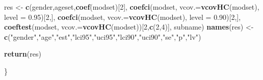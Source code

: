 \documentclass[
]{article}
\newenvironment{Shaded}{\begin{snugshade}}{\end{snugshade}}
\newcommand{\DataTypeTok}[1]{\textcolor[rgb]{0.13,0.29,0.53}{#1}}
\newcommand{\DecValTok}[1]{\textcolor[rgb]{0.00,0.00,0.81}{#1}}
\newcommand{\FloatTok}[1]{\textcolor[rgb]{0.00,0.00,0.81}{#1}}
\newcommand{\KeywordTok}[1]{\textcolor[rgb]{0.13,0.29,0.53}{\textbf{#1}}}
\newcommand{\NormalTok}[1]{#1}
\newcommand{\StringTok}[1]{\textcolor[rgb]{0.31,0.60,0.02}{#1}}
\begin{document}
\begin{Shaded}
\begin{Highlighting}[]
  
\NormalTok{  res <-}\StringTok{ }\KeywordTok{c}\NormalTok{(gender,ageset,}\KeywordTok{coef}\NormalTok{(modset)[}\DecValTok{2}\NormalTok{],}
           \KeywordTok{coefci}\NormalTok{(modset, }\DataTypeTok{vcov.=}\KeywordTok{vcovHC}\NormalTok{(modset), }\DataTypeTok{level =} \FloatTok{0.95}\NormalTok{)[}\DecValTok{2}\NormalTok{,],}
           \KeywordTok{coefci}\NormalTok{(modset, }\DataTypeTok{vcov.=}\KeywordTok{vcovHC}\NormalTok{(modset), }\DataTypeTok{level =} \FloatTok{0.90}\NormalTok{)[}\DecValTok{2}\NormalTok{,],}
           \KeywordTok{coeftest}\NormalTok{(modset, }\DataTypeTok{vcov.=}\KeywordTok{vcovHC}\NormalTok{(modset))[}\DecValTok{2}\NormalTok{,}\KeywordTok{c}\NormalTok{(}\DecValTok{2}\NormalTok{,}\DecValTok{4}\NormalTok{)],}
\NormalTok{           subname)}
  \KeywordTok{names}\NormalTok{(res) <-}\StringTok{ }\KeywordTok{c}\NormalTok{(}\StringTok{"gender"}\NormalTok{,}\StringTok{"age"}\NormalTok{,}\StringTok{"est"}\NormalTok{,}\StringTok{"lci95"}\NormalTok{,}\StringTok{"uci95"}\NormalTok{,}\StringTok{"lci90"}\NormalTok{,}\StringTok{"uci90"}\NormalTok{,}\StringTok{"se"}\NormalTok{,}\StringTok{"p"}\NormalTok{,}\StringTok{"lv"}\NormalTok{)}
  
  \KeywordTok{return}\NormalTok{(res)}
  
\NormalTok{\}}


\end{Highlighting}
\end{Shaded}
\end{document}
